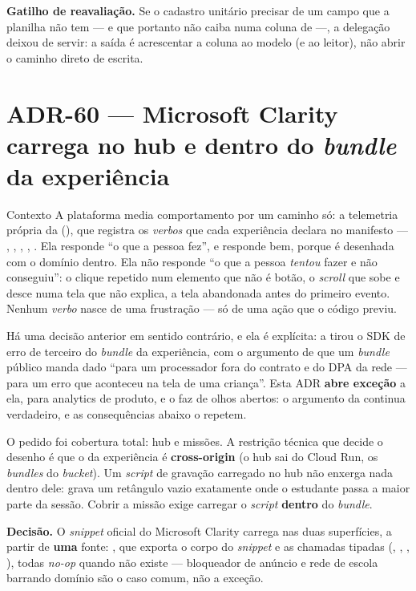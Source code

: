\textbf{Gatilho de reavaliação.} Se o cadastro unitário precisar de um campo que
a planilha não tem --- e que portanto não caiba numa coluna de
 ---, a delegação deixou de servir: a saída é acrescentar a
coluna ao modelo (e ao leitor), não abrir o caminho direto de escrita.
\section{ADR-60 --- Microsoft Clarity carrega no hub \textbf{e} dentro do
\emph{bundle} da experiência}
\label{adr:clarity}

\begin{especificacao}{Contexto}
A plataforma media comportamento por um caminho só: a telemetria própria da
 (), que registra os \emph{verbos}
que cada experiência declara no manifesto --- , ,
, , . Ela responde \enquote{o que a
pessoa fez}, e responde bem, porque é desenhada com o domínio dentro. Ela não
responde \enquote{o que a pessoa \emph{tentou} fazer e não conseguiu}: o clique
repetido num elemento que não é botão, o \emph{scroll} que sobe e desce numa
tela que não explica, a tela abandonada antes do primeiro evento. Nenhum
\emph{verbo} nasce de uma frustração --- só de uma ação que o código previu.

Há uma decisão anterior em sentido contrário, e ela é explícita: a
 tirou o SDK de erro de terceiro do \emph{bundle} da experiência,
com o argumento de que um \emph{bundle} público manda dado \enquote{para um
processador fora do contrato e do DPA da rede --- para um erro que aconteceu na
tela de uma criança}. Esta ADR \textbf{abre exceção} a ela, para analytics de
produto, e o faz de olhos abertos: o argumento da  continua
verdadeiro, e as consequências abaixo o repetem.

O pedido foi cobertura total: hub e missões. A restrição técnica que decide o
desenho é que o  da experiência é \textbf{cross-origin} (o hub sai
do Cloud Run, os \emph{bundles} do \emph{bucket}). Um \emph{script} de gravação
carregado no hub não enxerga nada dentro dele: grava um retângulo vazio
exatamente onde o estudante passa a maior parte da sessão. Cobrir a missão
exige carregar o \emph{script} \textbf{dentro} do \emph{bundle}.
\end{especificacao}

\textbf{Decisão.} O \emph{snippet} oficial do Microsoft Clarity carrega nas duas
superfícies, a partir de \textbf{uma} fonte:
, que exporta o corpo do \emph{snippet} e as
chamadas tipadas (, , , ), todas
\emph{no-op} quando  não existe --- bloqueador de anúncio e
rede de escola barrando domínio são o caso comum, não a exceção.

